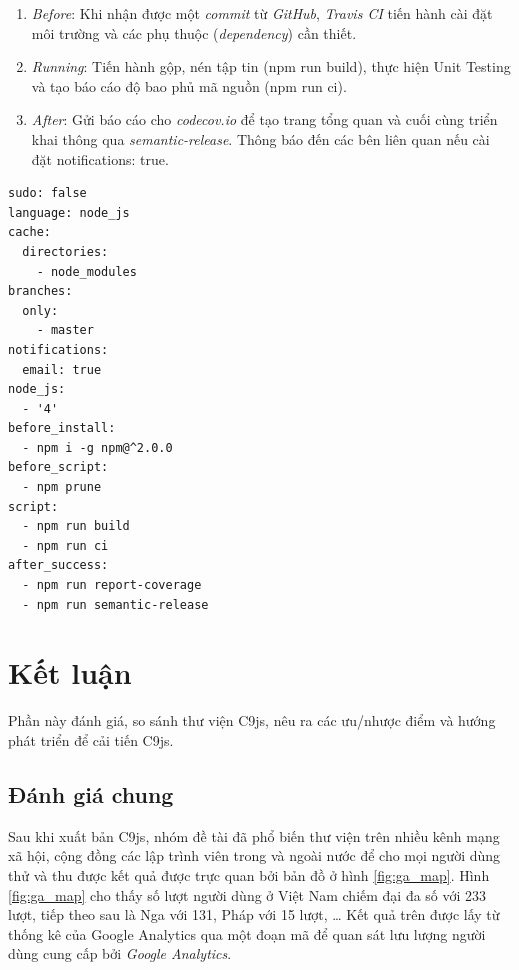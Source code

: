 \documentclass[12pt,a4paper]{article}
\newcommand*\NewPage{\newpage\null\thispagestyle{empty}\newpage}
\begin{document}
\begin{enumerate}
\item \emph{Before}: Khi nhận được một \textit{commit} từ \textit{GitHub}, \textit{Travis CI} tiến hành cài đặt môi trường và các phụ thuộc (\textit{dependency}) cần thiết.
\item \emph{Running}: Tiến hành gộp, nén tập tin (\textsf{npm run build}), thực hiện Unit Testing và tạo báo cáo độ bao phủ mã nguồn (\textsf{npm run ci}).
\item \emph{After}: Gửi báo cáo cho \textit{codecov.io} để tạo trang tổng quan và cuối cùng triển khai thông qua \textit{semantic-release}. Thông báo đến các bên liên quan nếu cài đặt \textsf{notifications: true}.
\end{enumerate}

\begin{lstlisting}[caption=Cấu hình Travis CI kiểm soát cả 3 giai đoạn,label={code:travisci}]
sudo: false
language: node_js
cache:
  directories:
    - node_modules
branches:
  only:
    - master
notifications:
  email: true
node_js:
  - '4'
before_install:
  - npm i -g npm@^2.0.0
before_script:
  - npm prune
script:
  - npm run build
  - npm run ci
after_success:
  - npm run report-coverage
  - npm run semantic-release
\end{lstlisting}

\clearpage
\NewPage
\section{Kết luận}
Phần này đánh giá, so sánh thư viện C9js, nêu ra các ưu/nhược điểm và hướng phát triển để cải tiến C9js.
\subsection{Đánh giá chung}\label{sec:eval}
Sau khi xuất bản C9js, nhóm đề tài đã phổ biến thư viện trên nhiều kênh mạng xã hội, cộng đồng các lập trình viên trong và ngoài nước để cho mọi người dùng thử và thu được kết quả được trực quan bởi bản đồ ở hình \ref{fig:ga_map}. Hình \ref{fig:ga_map} cho thấy số lượt người dùng ở Việt Nam chiếm đại đa số với 233 lượt, tiếp theo sau là Nga với 131, Pháp với 15 lượt, … Kết quả trên được lấy từ thống kê của Google Analytics qua một đoạn mã để quan sát lưu lượng người dùng cung cấp bởi \textit{Google Analytics}\cite{ga_c9js}.
\end{document}
